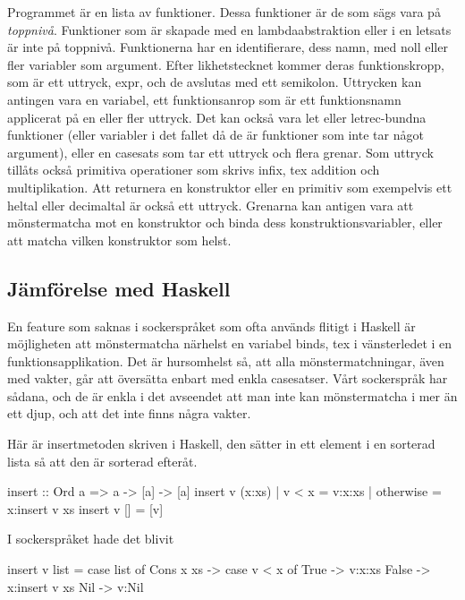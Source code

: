 \documentclass[Rapport]{subfiles}
\begin{document}
Programmet är en lista av funktioner. Dessa funktioner är de som sägs vara på
\emph{toppnivå}. Funktioner som är skapade med en lambdaabstraktion eller i en
letsats är inte på toppnivå. 
  Funktionerna har en identifierare, dess namn, med noll eller fler variabler som argument. Efter likhetstecknet
kommer deras funktionskropp, som är ett uttryck, expr, och de avslutas med
ett semikolon.
    Uttrycken kan antingen vara en variabel, ett funktionsanrop som är ett
funktionsnamn applicerat på en eller fler uttryck. Det kan också vara let eller
letrec-bundna funktioner (eller variabler i det fallet då de är funktioner som
inte tar något argument), eller en casesats som tar ett uttryck och flera grenar.
Som uttryck tillåts också primitiva operationer som skrivs infix, tex addition 
och multiplikation. Att returnera en konstruktor eller en primitiv som 
exempelvis ett heltal eller decimaltal är också ett uttryck.
    Grenarna kan antigen vara att mönstermatcha mot en konstruktor och binda
dess konstruktionsvariabler, eller att matcha vilken konstruktor som helst.

\subsection{Jämförelse med Haskell}

    En feature som saknas i sockerspråket som ofta används flitigt i Haskell är 
möjligheten att mönstermatcha närhelst en variabel binds, tex i vänsterledet
i en funktionsapplikation. Det är hursomhelst så, att alla mönstermatchningar,
även med vakter, går att översätta enbart med enkla casesatser. Vårt sockerspråk
har sådana, och de är enkla i det avseendet att man inte kan mönstermatcha i 
mer än ett djup, och att det inte finns några vakter.

Här är insertmetoden skriven i Haskell, den sätter in ett element i en sorterad
lista så att den är sorterad efteråt.

\begin{codeEx}
  insert :: Ord a => a -> [a] -> [a]
  insert v (x:xs) 
      | v < x     = v:x:xs
      | otherwise = x:insert v xs 
  insert v [] = [v]
\end{codeEx}                  

I sockerspråket hade det blivit

\begin{codeEx}
  insert v list = case list of
      Cons x xs -> case v < x of
          True  -> v:x:xs
          False -> x:insert v xs
      Nil -> v:Nil
\end{codeEx}
\end{document}
